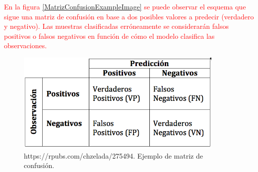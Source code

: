        \textcolor{red}{En la figura \eqref{MatrizConfusionExampleImage} se puede observar el esquema que sigue una matriz de confusión en base a dos posibles valores a predecir (verdadero y negativo). Las muestras clasificadas erróneamente se considerarán falsos positivos o falsos negativos en función de cómo el modelo clasifica las observaciones.}

        \begin{figure}[h]
            \centering
            \includegraphics[width=10cm]{archivos/4.Metodologia/Metricas/MatrizConfusion}
            \caption{https://rpubs.com/chzelada/275494. Ejemplo de matriz de confusión.}
            \label{MatrizConfusionExampleImage}
         \end{figure}

\newpage
